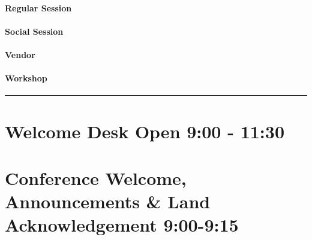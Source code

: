 \documentclass[
]{book}
\begin{document}
\begin{session}
\hypertarget{regular-session}{%
\paragraph{Regular Session}\label{regular-session}}
\end{session}
\begin{social}
\hypertarget{social-session}{%
\paragraph{Social Session}\label{social-session}}
\end{social}

\begin{vendor}
\hypertarget{vendor}{%
\paragraph{Vendor}\label{vendor}}
\end{vendor}

\begin{workshop}
\hypertarget{workshop}{%
\paragraph{Workshop}\label{workshop}}
\end{workshop}

\begin{center}\rule{0.5\linewidth}{0.5pt}\end{center}

\hypertarget{welcome-desk-open-900---1130}{%
\section*{Welcome Desk Open \textbar{} 9:00 - 11:30}\label{welcome-desk-open-900---1130}}

\hypertarget{conference-welcome-announcements-land-acknowledgement-900-915}{%
\section*{Conference Welcome, Announcements \& Land Acknowledgement \textbar{} 9:00-9:15}\label{conference-welcome-announcements-land-acknowledgement-900-915}}
\end{document}
